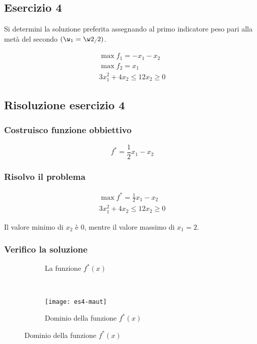 \documentclass[\main/main.tex]{subfiles}
\begin{document}
\subsection{Esercizio 4}
Si determini la soluzione preferita assegnando al primo indicatore peso pari alla metà del secondo $(\w_1 = \w2_/2)$.

\begin{align*}
  \max f_1 = -x_1 -x_2 \\
  \max f_2 = x_1       \\
  3x_1^2 + 4x_2 \leq 12
  x_2 \geq 0
\end{align*}

\subsection{Risoluzione esercizio 4}

\subsubsection*{Costruisco funzione obbiettivo}
\[
  f^* = \frac{1}{2}x_1 - x_2
\]

\subsubsection*{Risolvo il problema}

\begin{align*}
  \max f^* = \frac{1}{2}x_1 - x_2 \\
  3x_1^2 + 4x_2 \leq 12
  x_2 \geq 0
\end{align*}

Il valore minimo di $x_2$ è $0$, mentre il valore massimo di $x_1 = 2$.

\subsubsection*{Verifico la soluzione}

\begin{figure}
  \begin{subfigure}{0.45\textwidth}
    \caption{La funzione $f^*(x)$}
  \end{subfigure}
  ~
  \begin{subfigure}{0.45\textwidth}
    \texttt{[image: es4-maut]}
    \caption{Dominio della funzione $f^*(x)$}
  \end{subfigure}
\end{figure}
\end{document}
